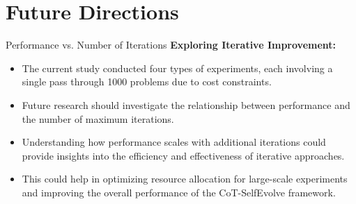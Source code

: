 \section{Future Directions}

\begin{frame}{Performance vs. Number of Iterations}
    \textbf{Exploring Iterative Improvement:}
    \begin{itemize}
        \item The current study conducted four types of experiments, each involving a single pass through 1000 problems due to cost constraints.

        \item Future research should investigate the relationship between performance and the number of maximum iterations.

        \item Understanding how performance scales with additional iterations could provide insights into the efficiency and effectiveness of iterative approaches.

        \item This could help in optimizing resource allocation for large-scale experiments and improving the overall performance of the CoT-SelfEvolve framework.
    \end{itemize}
\end{frame}

